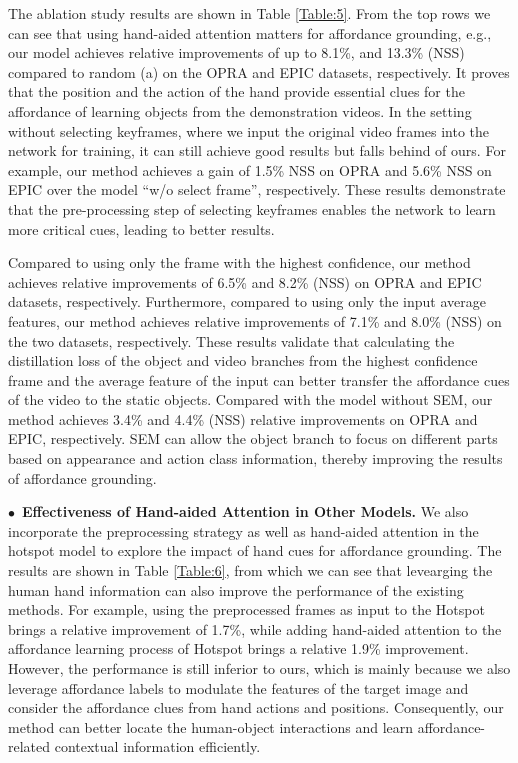 \documentclass[journal,twoside]{IEEEtran}
\newcommand{\myPara}[1]{\vspace{5pt}\noindent$\bullet$~\textbf{#1} \quad}
\begin{document}
\par The ablation study results are shown in Table \ref{Table:5}. From the top rows we can see that using hand-aided attention matters for affordance grounding, e.g., our model achieves relative improvements of up to 8.1\%, and 13.3\% (NSS) compared to random (a) on the OPRA \cite{demo2vec2018cvpr} and EPIC \cite{Damen2018EPICKITCHENS} datasets, respectively. It proves that the position and the action of the hand provide essential clues for the affordance of learning objects from the demonstration videos. In the setting without selecting keyframes, where we input the original video frames into the network for training, it can still achieve good results but falls behind of ours. For example, our method achieves a gain of 1.5\% NSS on OPRA and 5.6\% NSS on EPIC over the model ``w/o select frame'', respectively. These results demonstrate that the pre-processing step of selecting keyframes enables the network to learn more critical cues, leading to better results.

\par Compared to using only the frame with the highest confidence, our method achieves relative improvements of 6.5\% and 8.2\% (NSS) on OPRA and EPIC datasets, respectively. Furthermore, compared to using only the input average features, our method achieves relative improvements of 7.1\% and 8.0\% (NSS) on the two datasets, respectively. These results validate that calculating the distillation loss of the object and video branches from the highest confidence frame and the average feature of the input can better transfer the affordance cues of the video to the static objects. Compared with the model without SEM, our method achieves 3.4\% and 4.4\% (NSS) relative improvements on OPRA and EPIC, respectively. SEM can allow the object branch to focus on different parts based on appearance and action class information, thereby improving the results of affordance grounding.

\myPara{Effectiveness of Hand-aided Attention in Other Models.} We also incorporate the preprocessing strategy as well as hand-aided attention in the hotspot \cite{interaction-hotspots} model to explore the impact of hand cues for affordance grounding. The results are shown in Table \ref{Table:6}, from which we can see that levearging the human hand information can also improve the performance of the existing methods. For example, using the preprocessed frames as input to the Hotspot brings a relative improvement of 1.7\%, while adding hand-aided attention to the affordance learning process of Hotspot brings a relative 1.9\% improvement. However, the performance is still inferior to ours, which is mainly because we also leverage affordance labels to modulate the features of the target image and consider the affordance clues from hand actions and positions. Consequently, our method can better locate the human-object interactions and learn affordance-related contextual information efficiently.
\end{document}
